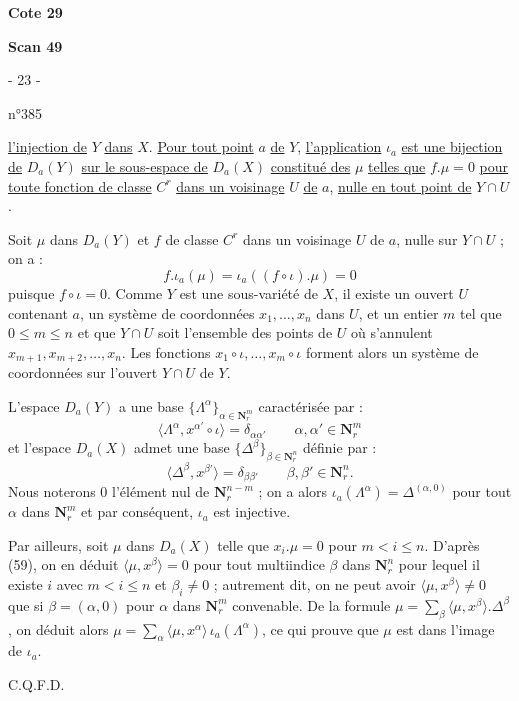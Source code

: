 \documentclass[11pt]{article}
\DeclareRobustCommand{\cotefile}[1]{\par\bigskip\textbf{Cote #1}\par}
\DeclareRobustCommand{\scanpage}[1]{\par\bigskip\textbf{Scan #1}\par}
\DeclareRobustCommand{\uline}[1]{\underline{#1}}
\begin{document}
\cotefile{29}
\scanpage{49}
\begin{center}- 23 -\end{center}
\begin{flushright}n°385\end{flushright}

\uline{l'injection de} $Y$ \uline{dans} $X$. \uline{Pour tout point} $a$ \uline{de} $Y$, \uline{l'application} $\iota_a$ \uline{est une bijection de} $D_a(Y)$ \uline{sur le sous-espace de} $D_a(X)$ \uline{constitué des} $\mu$ \uline{telles que} $f.\mu=0$ \uline{pour toute fonction de classe} $C^r$ \uline{dans un voisinage} $U$ \uline{de} $a$, \uline{nulle en tout point de} $Y\cap U$.

Soit $\mu$ dans $D_a(Y)$ et $f$ de classe $C^r$ dans un voisinage $U$ de $a$, nulle sur $Y\cap U$ ; on a :
\[
f.\iota_a(\mu)=\iota_a((f\circ\iota).\mu)=0
\]
puisque $f\circ\iota=0$. Comme $Y$ est une sous-variété de $X$, il existe un ouvert $U$ contenant $a$, un système de coordonnées $x_1,\ldots,x_n$ dans $U$, et un entier $m$ tel que $0\leq m\leq n$ et que $Y\cap U$ soit l'ensemble des points de $U$ où s'annulent $x_{m+1},x_{m+2},\ldots,x_n$. Les fonctions $x_1\circ\iota,\ldots,x_m\circ\iota$ forment alors un système de coordonnées sur l'ouvert $Y\cap U$ de $Y$.

L'espace $D_a(Y)$ a une base $\{\Lambda^\alpha\}_{\alpha\in\mathbf{N}_r^m}$ caractérisée par :
\[
\langle\Lambda^\alpha,x^{\alpha'}\circ\iota\rangle=\delta_{\alpha\alpha'}
\qquad \alpha,\alpha'\in\mathbf{N}_r^m
\]
et l'espace $D_a(X)$ admet une base $\{\Delta^\beta\}_{\beta\in\mathbf{N}_r^n}$ définie par :
\[
\langle\Delta^\beta,x^{\beta'}\rangle=\delta_{\beta\beta'}
\qquad \beta,\beta'\in\mathbf{N}_r^n.
\]
Nous noterons $0$ l'élément nul de $\mathbf{N}_r^{n-m}$ ; on a alors $\iota_a(\Lambda^\alpha)=\Delta^{(\alpha,0)}$ pour tout $\alpha$ dans $\mathbf{N}_r^m$ et par conséquent, $\iota_a$ est injective.

Par ailleurs, soit $\mu$ dans $D_a(X)$ telle que $x_i.\mu=0$ pour $m<i\leq n$. D'après (59), on en déduit $\langle\mu,x^\beta\rangle=0$ pour tout multiindice $\beta$ dans $\mathbf{N}_r^n$ pour lequel il existe $i$ avec $m<i\leq n$ et $\beta_i\neq0$ ; autrement dit, on ne peut avoir $\langle\mu,x^\beta\rangle\neq0$ que si $\beta=(\alpha,0)$ pour $\alpha$ dans $\mathbf{N}_r^m$ convenable. De la formule $\mu=\sum_\beta\langle\mu,x^\beta\rangle.\Delta^\beta$, on déduit alors $\mu=\sum_\alpha\langle\mu,x^\alpha\rangle\,\iota_a(\Lambda^\alpha)$, ce qui prouve que $\mu$ est dans l'image de $\iota_a$.
\begin{flushright}C.Q.F.D.\end{flushright}
\end{document}
